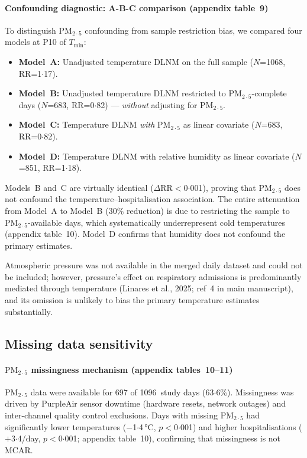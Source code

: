 \documentclass[12pt]{article}
\begin{document}
\paragraph{Confounding diagnostic: A-B-C comparison (appendix table~9)}
To distinguish $\text{PM}_{2{\cdot}5}$ confounding from sample restriction
bias, we compared four models at P10 of $T_\mathrm{min}$:
\begin{itemize}
  \item \textbf{Model~A:} Unadjusted temperature DLNM on the full
    sample ($N$=1068, RR=1${\cdot}$17).
  \item \textbf{Model~B:} Unadjusted temperature DLNM restricted to
    $\text{PM}_{2{\cdot}5}$-complete days ($N$=683, RR=0${\cdot}$82) ---
    \emph{without} adjusting for $\text{PM}_{2{\cdot}5}$.
  \item \textbf{Model~C:} Temperature DLNM \emph{with} $\text{PM}_{2{\cdot}5}$
    as linear covariate ($N$=683, RR=0${\cdot}$82).
  \item \textbf{Model~D:} Temperature DLNM with relative humidity as
    linear covariate ($N$=851, RR=1${\cdot}$18).
\end{itemize}
Models~B and~C are virtually identical ($\Delta$RR$<$0${\cdot}$001),
proving that $\text{PM}_{2{\cdot}5}$ does not confound the
temperature--hospitalisation association. The entire attenuation from
Model~A to Model~B (30\% reduction) is due to restricting the sample
to $\text{PM}_{2{\cdot}5}$-available days, which systematically
underrepresent cold temperatures (appendix table~10). Model~D confirms that
humidity does not confound the primary estimates.

Atmospheric pressure was not available in the merged daily dataset and
could not be included; however, pressure's effect on respiratory
admissions is predominantly mediated through
temperature (Linares et al., 2025; ref~4 in main manuscript), and its omission is unlikely to bias
the primary temperature estimates substantially.

\subsection*{Missing data sensitivity}

\paragraph{$\text{PM}_{2{\cdot}5}$ missingness mechanism (appendix tables~10--11)}
$\text{PM}_{2{\cdot}5}$ data were available for 697 of 1096~study days
(63${\cdot}$6\%). Missingness was driven by PurpleAir sensor downtime
(hardware resets, network outages) and inter-channel quality control
exclusions. Days with missing $\text{PM}_{2{\cdot}5}$ had significantly lower
temperatures ($-$1${\cdot}$4\,°C, $p$$<$0${\cdot}$001) and higher
hospitalisations ($+$3${\cdot}$4/day, $p$$<$0${\cdot}$001; appendix table~10),
confirming that missingness is not MCAR.
\end{document}
